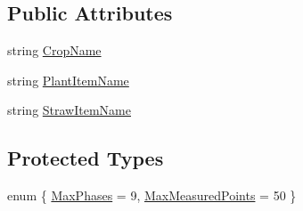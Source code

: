 \subsection*{Public Attributes}
\begin{DoxyCompactItemize}
\item 
string \hyperlink{classcrop_af852d2f62dd22411199ae8e164536a7d}{CropName}
\item 
string \hyperlink{classcrop_af982befddb79f8aedfa207bce540c47a}{PlantItemName}
\item 
string \hyperlink{classcrop_aa2aceced21d0fee166e40a836c2ee9cc}{StrawItemName}
\end{DoxyCompactItemize}
\subsection*{Protected Types}
\begin{DoxyCompactItemize}
\item 
enum \{ \hyperlink{classcrop_abcf1ea79bf745adc82536072ed52cb34ae1dd25438b62c5ebf1af3f86fd0e3039}{MaxPhases} = 9, 
\hyperlink{classcrop_abcf1ea79bf745adc82536072ed52cb34a44205a77100c5a12cdd20fd59ffc2c69}{MaxMeasuredPoints} =  50
 \}
\end{DoxyCompactItemize}
